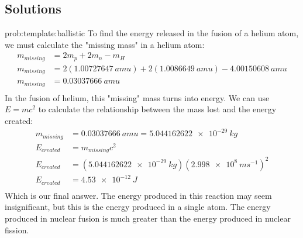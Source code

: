 \subsection{Solutions}
\begin{solution}{prob:template:ballistic}\label{soln:template:ballistic}
To find the energy released in the fusion of a helium atom, we must calculate the "missing mass" in a helium atom:
\begin{align*}
m_{missing} &= 2m_p +2m_n - m_H\\
m_{missing} &= 2(\SI{1.00727647}{amu}) +2(\SI{1.0086649}{amu}) - \SI{4.00150608}{amu}\\
m_{missing} &= \SI{0.03037666}{amu}\\
\end{align*}
In the fusion of helium, this "missing" mass turns into energy. We can use $E=mc^2$ to calculate the relationship between the mass lost and the energy created:
\begin{align*}
m_{missing} &= \SI{0.03037666}{amu} = \SI{5.044162622e-29}{kg}\\
E_{created} &= m_{missing}c^2\\
E_{created} &= (\SI{5.044162622e-29}{kg})(\SI{2.998e8}{ms^{-1}})^2\\
E_{created} &= \SI{4.53e-12}{J}\\
\end{align*}
Which is our final answer. The energy produced in this reaction may seem insignificant, but this is the energy produced in a single atom. The energy produced in nuclear fusion is much greater than the energy produced in nuclear fission.
\end{solution}

